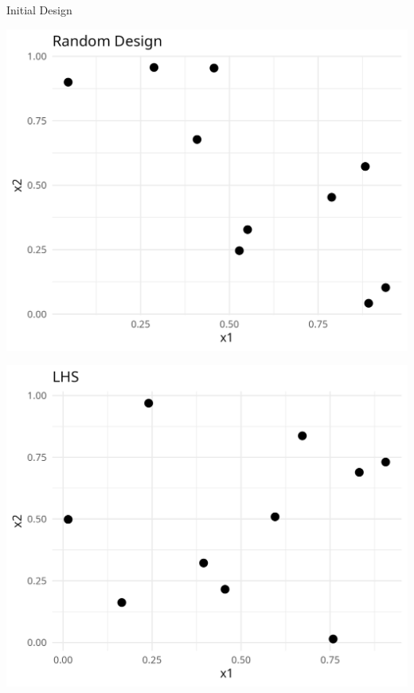 \documentclass[11pt,compress,t,notes=noshow, xcolor=table]{beamer}
\begin{document}
\begin{vbframe}{Initial Design}
\begin{minipage}[b]{0.45\textwidth}
  \includegraphics[width = \textwidth]{slides/010-bayesian-optimization/figure_man/init_0.png}
\end{minipage}
\hfill
\begin{minipage}[b]{0.45\textwidth}
  \includegraphics[width = \textwidth]{slides/010-bayesian-optimization/figure_man/init_1.png}
\end{minipage}

\end{vbframe}
\end{document}
